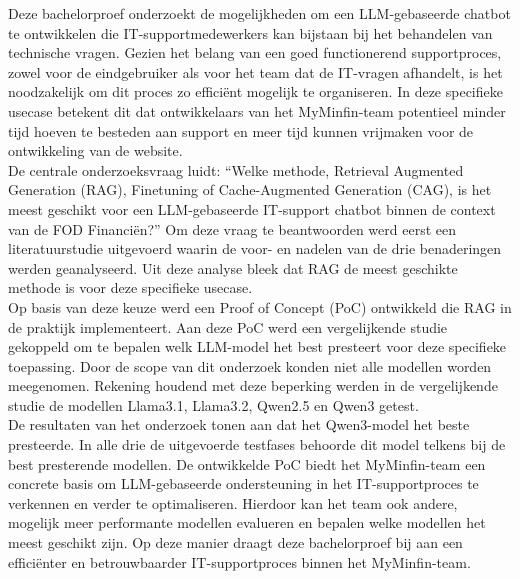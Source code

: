 Deze bachelorproef onderzoekt de mogelijkheden om een LLM-gebaseerde chatbot te ontwikkelen die IT-supportmedewerkers kan bijstaan bij het behandelen van technische vragen. Gezien het belang van een goed functionerend supportproces, zowel voor de eindgebruiker als voor het team dat de IT-vragen afhandelt, is het noodzakelijk om dit proces zo efficiënt mogelijk te organiseren. In deze specifieke usecase betekent dit dat ontwikkelaars van het MyMinfin-team potentieel minder tijd hoeven te besteden aan support en meer tijd kunnen vrijmaken voor de ontwikkeling van de website.
\\[1em]
De centrale onderzoeksvraag luidt: “Welke methode, Retrieval Augmented Generation (RAG), Finetuning of Cache-Augmented Generation (CAG), is het meest geschikt voor een LLM-gebaseerde IT-support chatbot binnen de context van de FOD Financiën?” Om deze vraag te beantwoorden werd eerst een literatuurstudie uitgevoerd waarin de voor- en nadelen van de drie benaderingen werden geanalyseerd. Uit deze analyse bleek dat RAG de meest geschikte methode is voor deze specifieke usecase.
\\[1em]
Op basis van deze keuze werd een Proof of Concept (PoC) ontwikkeld die RAG in de praktijk implementeert. Aan deze PoC werd een vergelijkende studie gekoppeld om te bepalen welk LLM-model het best presteert voor deze specifieke toepassing. Door de scope van dit onderzoek konden niet alle modellen worden meegenomen. Rekening houdend met deze beperking werden in de vergelijkende studie de modellen Llama3.1, Llama3.2, Qwen2.5 en Qwen3 getest.
\\[1em]
De resultaten van het onderzoek tonen aan dat het Qwen3-model het beste presteerde. In alle drie de uitgevoerde testfases behoorde dit model telkens bij de best presterende modellen. De ontwikkelde PoC biedt het MyMinfin-team een concrete basis om LLM-gebaseerde ondersteuning in het IT-supportproces te verkennen en verder te optimaliseren. Hierdoor kan het team ook andere, mogelijk meer performante modellen evalueren en bepalen welke modellen het meest geschikt zijn. Op deze manier draagt deze bachelorproef bij aan een efficiënter en betrouwbaarder IT-supportproces binnen het MyMinfin-team.